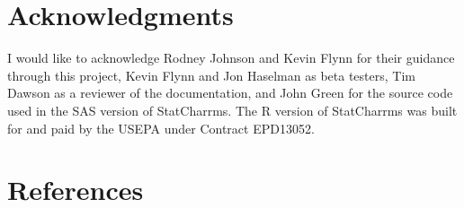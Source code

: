 \documentclass[a4paper]{article}
\begin{document}
	
	
	
\section*{Acknowledgments}
\label{sec:Acknowledgments}
\thispagestyle{plain}
	I would like to acknowledge Rodney Johnson and Kevin Flynn for their guidance through this project,  Kevin Flynn and Jon Haselman 
	as beta testers,  Tim Dawson as a reviewer of the documentation, and John Green for the source code used in the
	SAS version of StatCharrms. The R version of StatCharrms was built for and paid by the USEPA under Contract 
	EPD\textendash{}13\textendash{}052.
	
		
\section*{References}
\label{sec:References}
\thispagestyle{plain}
\end{document}
